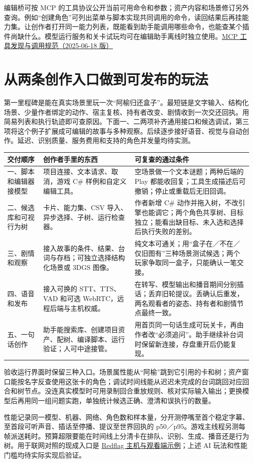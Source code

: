 \documentclass[UTF8,11pt,fontset=fandol,a4paper]{ctexart}
\newcommand{\pg}[1]{\clearpage\section{#1}}
\newcommand{\src}[2]{\href{#1}{#2}}
\begin{document}
编辑桥可按 MCP 的工具协议公开当前可用命令和参数；资产内容和场景修订另外查询。例如“创建角色”可列出菜单与脚本实现共同调用的命令，读回结果后再挂能力集。让创作者打开同一能力列表，既能看到助手能调用哪些命令，也能查某个插件尚缺什么。模型运行服务和关卡试玩均可在编辑助手离线时独立使用。\src{https://modelcontextprotocol.io/specification/2025-06-18/server/tools}{MCP 工具发现与调用规范（2025-06-18 版）}

\pg{从两条创作入口做到可发布的玩法}
第一里程碑是能在真实场景里玩一次“阿榆归还盒子”。最短链是文字输入、结构化场景、少量作者绑定的动作、宿主复核、持有者改变、剧情收到一次交还回执。用简易列表和执行轨迹即可查原因。下面一、二两项补齐通用接口和候选调试，第三项将这个例子扩展成可编辑的故事与多种观察。后续逐步接好语音、视觉与自动创作。延迟、识别质量、服务费用和支持的角色并发量均待实测。

\begin{center}\small
\begin{tabularx}{\linewidth}{@{}L{28mm}Y Y@{}}\toprule
交付顺序 & 创作者手里的东西 & 可复查的通过条件 \\ \midrule
一、脚本和编辑器接模型 & 项目连接、文本请求、取消，游戏 C\# 样例和自定义编辑工具。 & 空场景做一个文本谜题；两种后端的 Play 都能收回复；工具生成描述后可撤销；停止或重载后无旧回调。\\
二、候选库和可视行为树 & 卡片、能力集、CSV 导入、异步选择、子树、运行检查器。 & 作者新增 C\# 动作并拖入树，不改引擎也能调它；两个角色共享树、目标独立；能看出缺目标、未入选和选择后执行失败的差别。\\
三、剧情和观察 & 接入故事的条件、结果、台词与存档；可独立选择结构化场景或 3DGS 图像。 & 纯文本可通关；用“盒子在／不在／仅旧图有”三种场景测试候选；两个玩家争取同一盒子，只能确认一笔交接。\\
四、语音和发布 & 接入可换的 STT、TTS、VAD 和可选 WebRTC，远程后端与主机权威。 & 在转写、模型输出和播音期间分别插话；丢弃旧轮提议。丢确认后重发，两名观看者的姿态、持有者和剧情节点最终一致。\\
五、一句话创作 & 助手能搜索库、创建项目资产、配树、编译脚本、运行验证；人可中途接管。 & 用首页同一句话生成可玩关卡，再由作者改“必须追问”。助手继续补台词时保留新连接，存盘重开后仍能复现。\\ \bottomrule
\end{tabularx}
\end{center}

验收运行界面时保留三种入口。场景属性能从“阿榆”跳到它引用的卡和树；资产窗口能按名字反查使用这张卡的角色；调试时间线能从迟迟未完成的台词跳回对应回合和树节点。没连真实模型时可用录制回合重放规则、核对实际输入输出；更换模型后再用同一组问题实跑，单独统计候选正确、澄清和误执行的数量。

性能记录同一模型、机器、网络、角色数和样本量，分开测停嘴至首个稳定字幕、至首段可听声音、插话至停播、提议至世界回执的 p50／p95。游戏主线程另测每帧派送耗时。预算超限要能在时间线上分清卡在排队、识别、生成、播音还是行为树。用于联网对照的现成入口是 \src{run:D:/Cdev/Redflag/examples/Network/WorldWorkshop.cpp}{Redflag 主机与观看端示例}；上述 AI 玩法和性能门槛均待实际实现后验证。
\end{document}
